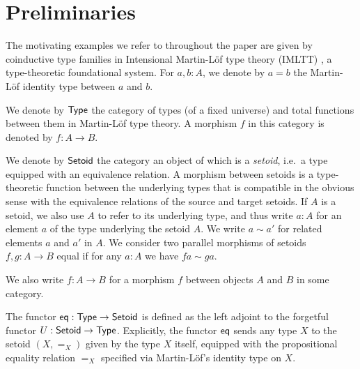 \documentclass{amsart}
\begin{document}
 
 

\section{Preliminaries}\label{sec:preliminaries}




The motivating examples we refer to throughout the paper are given by coinductive type families in Intensional Martin-L\"of type theory (IMLTT) \parencite{martin_lof}, 
a type-theoretic foundational system.
For $a,b : A$, we denote by $a = b$ the Martin-L\"of identity type between $a$ and $b$.



% 

\begin{definition}\label{def:set_setoid}
 We denote by $\mathsf{Type}$ the category of types (of a fixed universe) and total functions between them in Martin-L\"of type theory. 
 A morphism $f$ in this category is denoted by $f : A \to B$.
 
 We denote by $\mathsf{Setoid}$ the category an object of which is a \emph{setoid}, i.e.\ a type equipped with an equivalence relation.
 A morphism between setoids is a type-theoretic function between the underlying types that is compatible in the obvious sense with the equivalence relations of the source and target setoids.
 If $A$ is a setoid, we also use $A$ to refer to its underlying type, and thus write $a:A$ for an element $a$ of the type underlying the setoid $A$. 
 We write $a\sim a'$ for related elements $a$ and $a'$ in $A$.
 We consider two parallel morphisms of setoids $f,g:A\to B$ equal if for any $a:A$ we have $fa \sim ga$.
\end{definition}

We also write $f:A\to B$ for a morphism $f$ between objects $A$ and $B$ in some category.


\begin{definition}\label{def:eq}
 The functor $\mathsf{eq} : \mathsf{Type}\to\mathsf{Setoid}$ is defined as the left adjoint to the forgetful functor $U : \mathsf{Setoid} \to \mathsf{Type}$.
  Explicitly, the functor $\mathsf{eq}$ sends any type $X$ to the setoid $(X,=_X)$ given by the type $X$ itself, equipped
  with the propositional equality relation $=_X$ specified via Martin-L\"of's identity type on $X$.
\end{definition}
\end{document}
